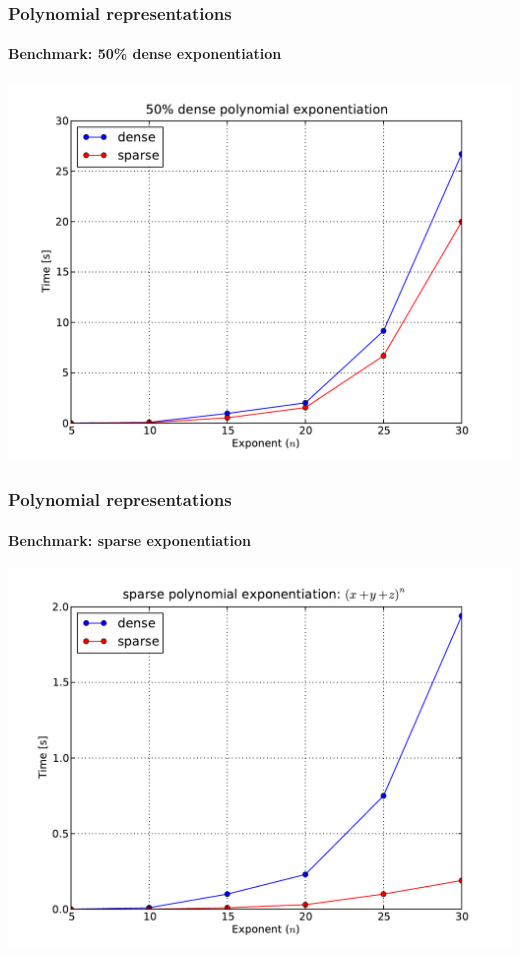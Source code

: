 \documentclass{beamer}
\begin{document}
\begin{frame}
    \frametitle{Polynomial representations}
    \framesubtitle{Benchmark: 50\% dense exponentiation}

    \begin{center}
        \includegraphics[scale=0.45]{images/50-dense-power.pdf}
    \end{center}
\end{frame}

\begin{frame}
    \frametitle{Polynomial representations}
    \framesubtitle{Benchmark: sparse exponentiation}

    \begin{center}
        \includegraphics[scale=0.45]{images/sparse-power.pdf}
    \end{center}
\end{frame}
\end{document}
